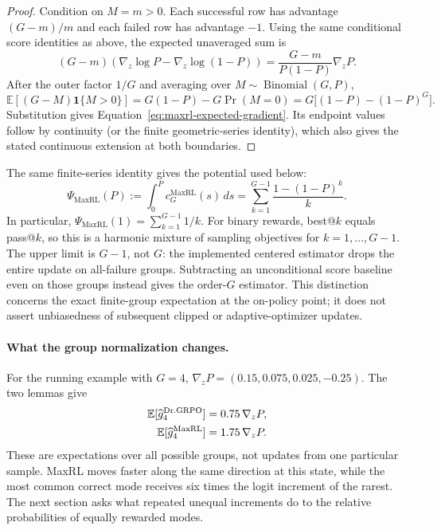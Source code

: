 \documentclass{article}
\newcommand{\1}{\mathbf 1}
\newcommand{\E}{\mathbb E}
\theoremstyle{remark}
\theoremstyle{definition}
\theoremstyle{plain}
\begin{document}
\begin{proof}
Condition on $M=m>0$. Each successful row has advantage $(G-m)/m$ and each
failed row has advantage $-1$. Using the same conditional score identities as
above, the expected unaveraged sum is
\[
  (G-m)\!\left(\nabla_z\log P-\nabla_z\log(1-P)\right)
  =\frac{G-m}{P(1-P)}\nabla_zP.
\]
After the outer factor $1/G$ and averaging over
$M\sim\operatorname{Binomial}(G,P)$,
\[
 \E[(G-M)\1\{M>0\}]
 =G(1-P)-G\Pr(M=0)
 =G\big[(1-P)-(1-P)^G\big].
\]
Substitution gives Equation~\eqref{eq:maxrl-expected-gradient}. Its endpoint
values follow by continuity (or the finite geometric-series identity), which
also gives the stated continuous extension at both boundaries.
\end{proof}

The same finite-series identity gives the potential used below:
\begin{equation}
 \Psi_{\mathrm{MaxRL}}(P)
 :=\int_0^P c_G^{\mathrm{MaxRL}}(s)\,ds
 =\sum_{k=1}^{G-1}\frac{1-(1-P)^k}{k}.
 \label{eq:maxrl-potential-finite-sum}
\end{equation}
In particular, $\Psi_{\mathrm{MaxRL}}(1)=\sum_{k=1}^{G-1}1/k$.
For binary rewards, best@\(k\) equals pass@\(k\), so this is a harmonic
mixture of sampling objectives for $k=1,\ldots,G-1$. The upper limit is
$G-1$, not $G$: the implemented centered estimator drops the entire update
on all-failure groups. Subtracting an unconditional score baseline even on
those groups instead gives the order-$G$ estimator. This distinction concerns
the exact finite-group expectation at the on-policy point; it does not assert
unbiasedness of subsequent clipped or adaptive-optimizer updates.

\paragraph{What the group normalization changes.}
For the running example with $G=4$,
$\nabla_zP=(0.15,0.075,0.025,-0.25)$. The two lemmas give
\[
 \begin{aligned}
 \mathbb E[\widehat g_4^{\rm Dr.GRPO}]&=0.75\,\nabla_zP,\\
 \mathbb E[\widehat g_4^{\rm MaxRL}]&=1.75\,\nabla_zP.
 \end{aligned}
\]
These are expectations over all possible groups, not updates from one
particular sample. MaxRL moves faster along the same direction at this
state, while the most common correct mode receives six times the logit
increment of the rarest. The next section asks what repeated unequal
increments do to the relative probabilities of equally rewarded modes.
\end{document}
